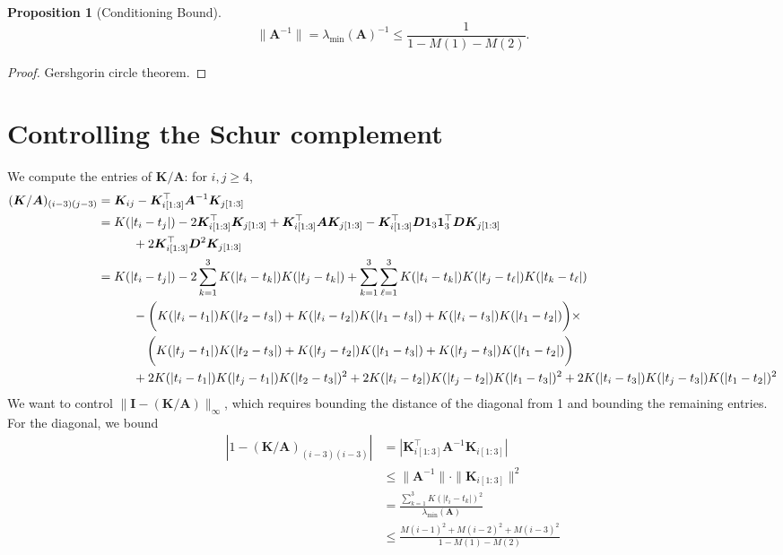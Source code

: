 \documentclass[11pt]{article}
\newcommand{\one}{\bm{1}}
\newcommand{\bA}{\bm A}
\newcommand{\bD}{\bm D}
\newcommand{\bK}{\bm K}
\newtheorem{proposition}{Proposition}
\begin{document}
\begin{proposition}[Conditioning Bound]
    \[ \|\bA^{-1}\| = \lambda_{\min}(\bA)^{-1} \leq \frac{1}{1 - M(1) - M(2)}. \]
\end{proposition}
\begin{proof}
    Gershgorin circle theorem.
\end{proof}

\section{Controlling the Schur complement}

We compute the entries of $\bK / \bA$: for $i, j \geq 4$,
\begin{align*}
  (\bK / \bA)_{(i - 3)(j - 3)}
  &= \bK_{ij} - \bK_{i[1:3]}^\top \bA^{-1} \bK_{j[1:3]} \\
  &= K(|t_i - t_j|) - 2\bK_{i[1:3]}^\top\bK_{j[1:3]} + \bK_{i[1:3]}^\top\bA\bK_{j[1:3]} - \bK_{i[1:3]}^\top\bD\one_3\one_3^\top\bD\bK_{j[1:3]} \\
  &\hspace{1cm} + 2\bK_{i[1:3]}^\top\bD^2\bK_{j[1:3]} \\
  &= K(|t_i - t_j|) - 2\sum_{k = 1}^3 K(|t_i - t_k|)K(|t_j - t_k|) + \sum_{k = 1}^3\sum_{\ell = 1}^3K(|t_i - t_k|)K(|t_j - t_\ell|)K(|t_k - t_\ell|) \\
  &\hspace{1cm} - \bigg(K(|t_i - t_1|)K(|t_2 - t_3|) + K(|t_i - t_2|)K(|t_1 - t_3|) + K(|t_i - t_3|)K(|t_1 - t_2|)\bigg) \times \\
  &\hspace{1.4cm} \bigg(K(|t_j - t_1|)K(|t_2 - t_3|) + K(|t_j - t_2|)K(|t_1 - t_3|) + K(|t_j - t_3|)K(|t_1 - t_2|)\bigg) \\
  &\hspace{1cm} + 2K(|t_i - t_1|)K(|t_j - t_1|)K(|t_2 - t_3|)^2 + 2K(|t_i - t_2|)K(|t_j - t_2|)K(|t_1 - t_3|)^2 + 2K(|t_i - t_3|)K(|t_j - t_3|)K(|t_1 - t_2|)^2
\end{align*}
We want to control $\|\bm I - (\bK / \bA)\|_{\infty}$, which requires bounding the distance of the diagonal from 1 and bounding the remaining entries.
For the diagonal, we bound
\begin{align*}
  |1 - (\bK / \bA)_{(i - 3)(i - 3)}|
  &= |\bK_{i[1:3]}^\top \bA^{-1} \bK_{i[1:3]}| \\
  &\leq \| \bA^{-1} \| \cdot \|\bK_{i[1:3]}\|^2 \\
  &= \frac{\sum_{k = 1}^3 K(|t_i - t_k|)^2}{\lambda_{\min}(\bA)} \\
  &\leq \frac{M(i - 1)^2 + M(i - 2)^2 + M(i - 3)^2}{1 - M(1) - M(2)}
\end{align*}
\end{document}
